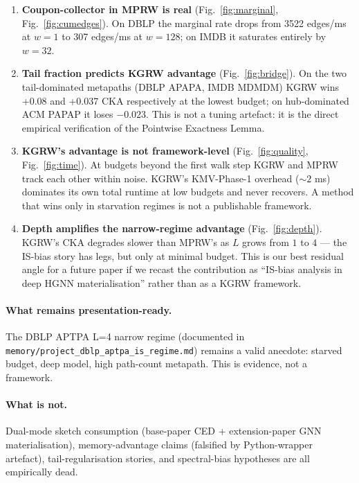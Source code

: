 \documentclass[11pt]{article}
\begin{document}
\begin{enumerate}
\item \textbf{Coupon-collector in MPRW is real}
(Fig.~\ref{fig:marginal}, Fig.~\ref{fig:cumedges}). On DBLP the marginal
rate drops from 3522 edges/ms at $w=1$ to 307 edges/ms at $w=128$; on IMDB
it saturates entirely by $w=32$.

\item \textbf{Tail fraction predicts KGRW advantage}
(Fig.~\ref{fig:bridge}). On the two tail-dominated metapaths (DBLP APAPA,
IMDB MDMDM) KGRW wins +0.08 and +0.037 CKA respectively at the lowest
budget; on hub-dominated ACM PAPAP it loses $-0.023$. This is not a tuning
artefact: it is the direct empirical verification of the Pointwise
Exactness Lemma.

\item \textbf{KGRW's advantage is not framework-level}
(Fig.~\ref{fig:quality}, Fig.~\ref{fig:time}). At budgets beyond the first
walk step KGRW and MPRW track each other within noise. KGRW's KMV-Phase-1
overhead ($\sim 2$ ms) dominates its own total runtime at low budgets and
never recovers. A method that wins only in starvation regimes is not a
publishable framework.

\item \textbf{Depth amplifies the narrow-regime advantage}
(Fig.~\ref{fig:depth}). KGRW's CKA degrades slower than MPRW's as
$L$ grows from $1$ to $4$ — the IS-bias story has legs, but only at
minimal budget. This is our best residual angle for a future paper if
we recast the contribution as ``IS-bias analysis in deep HGNN
materialisation'' rather than as a KGRW framework.
\end{enumerate}

\paragraph{What remains presentation-ready.} The DBLP APTPA L=4 narrow
regime (documented in \texttt{memory/project\_dblp\_aptpa\_is\_regime.md})
remains a valid anecdote: starved budget, deep model, high path-count
metapath. This is evidence, not a framework.

\paragraph{What is not.} Dual-mode sketch consumption (base-paper CED +
extension-paper GNN materialisation), memory-advantage claims
(falsified by Python-wrapper artefact), tail-regularisation stories, and
spectral-bias hypotheses are all empirically dead.
\end{document}
